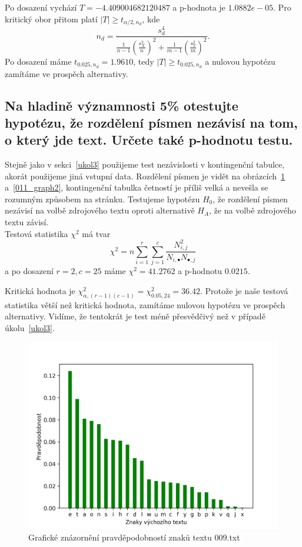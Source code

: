 \documentclass[12pt]{article}
\begin{document}
Po dosazení vychází $T = -4.409004682120487$ a p-hodnota je $1.0882e-05$.
Pro kritický obor přitom platí $|T| \ge t_{\alpha/2,n_d}$, kde
$$n_d = \frac{s_d^4}{\frac{1}{n-1}(\frac{s_X^2}{n})^2+\frac{1}{m-1}(\frac{s_Y^2}{m})^2}.$$
Po dosazení máme $t_{0.025, n_d} = 1.9610$, tedy $|T| \ge t_{0.025, n_d}$ a nulovou hypotézu zamítáme ve prospěch
alternativy.

  \subsection{Na hladině významnosti 5\% otestujte hypotézu, že rozdělení písmen nezávisí na tom, o který jde text. Určete také p-hodnotu testu.}
    Stejně jako v sekci~\ref{ukol3} použijeme test nezávislosti v kontingenční tabulce, akorát použijeme jiná vstupní data.
    Rozdělení písmen je vidět na obrázcích~\ref{009_graph2} a~\ref{011_graph2}, kontingenční tabulka četností je příliš
    velká a nevešla se rozumným způsobem na stránku. Testujeme hypotézu $H_0$, že rozdělení
    písmen nezávisí na volbě zdrojového textu oproti alternativě $H_A$, že na volbě zdrojového textu závisí. \\
   
Testová statistika $\chi^2$ má tvar
$$\chi^2 = n\sum_{i =1}^r\sum_{j=1}^c \frac{N_{i,j}^2}{N_{i, \bullet}N_{\bullet, j}}$$
a po dosazení $r=2, c=25$ máme $\chi^2 = 41.2762$ a p-hodnotu $0.0215$.

Kritická hodnota je $\chi^2_{\alpha, (r-1)(c-1)} = \chi^2_{0.05,24} = 36.42$. Protože je naše testová statistika větší
než kritická hodnota, zamítáme nulovou hypotézu ve prospěch alternativy. Vidíme, že tentokrát je test méně přesvědčivý
než v případě úkolu~\ref{ukol3}.

\begin{figure}[!ht]
\includegraphics[scale=0.8]{009_char_prob.png}\centering\caption{Grafické znázornění pravděpodobností znaků textu 009.txt}\label{009_graph2}
\end{figure}
\end{document}
